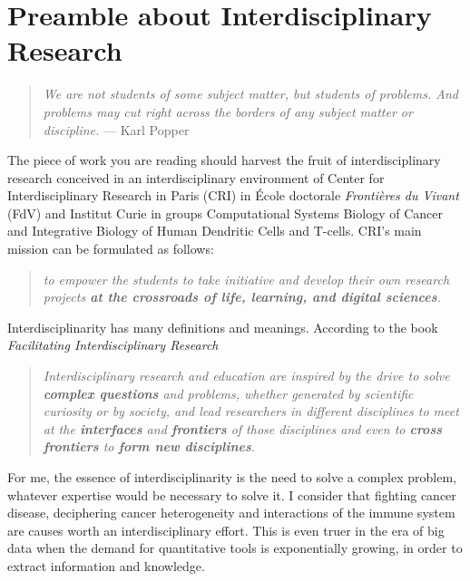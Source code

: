 \documentclass[12pt,]{book}
\theoremstyle{definition}
\theoremstyle{definition}
\theoremstyle{definition}
\theoremstyle{remark}
\begin{document}
\newpage
\thispagestyle{empty}

\hypertarget{preamble-about-interdisciplinary-research}{%
\chapter*{Preamble about Interdisciplinary
Research}\label{preamble-about-interdisciplinary-research}}

\setcounter{page}{27}
\renewcommand{\thepage}{\arabic{page}}

\begin{quote}
\emph{We are not students of some subject matter, but students of
problems. And problems may cut right across the borders of any subject
matter or discipline.} --- Karl Popper
\end{quote}

The piece of work you are reading should harvest the fruit of
interdisciplinary research conceived in an interdisciplinary environment
of Center for Interdisciplinary Research in Paris (CRI) in École
doctorale \emph{Frontières du Vivant} (FdV) and Institut Curie in groups
Computational Systems Biology of Cancer and Integrative Biology of Human
Dendritic Cells and T-cells. CRI's main mission can be formulated as
follows:

\begin{quote}
\emph{to empower the students to take initiative and develop their own
research projects \textbf{at the crossroads of life, learning, and
digital sciences}.} \citep{CRIweb}
\end{quote}

Interdisciplinarity has many definitions and meanings. According to the
book \emph{Facilitating Interdisciplinary Research} \citep{FIRbook}

\begin{quote}
\emph{Interdisciplinary research and education are inspired by the drive
to solve \textbf{complex questions} and problems, whether generated by
scientific curiosity or by society, and lead researchers in different
disciplines to meet at the \textbf{interfaces} and \textbf{frontiers} of
those disciplines and even to \textbf{cross frontiers} to \textbf{form
new disciplines}.}
\end{quote}

For me, the essence of interdisciplinarity is the need to solve a
complex problem, whatever expertise would be necessary to solve it. I
consider that fighting cancer disease, deciphering cancer heterogeneity
and interactions of the immune system are causes worth an
interdisciplinary effort. This is even truer in the era of big data when
the demand for quantitative tools is exponentially growing, in order to
extract information and knowledge.
\end{document}
